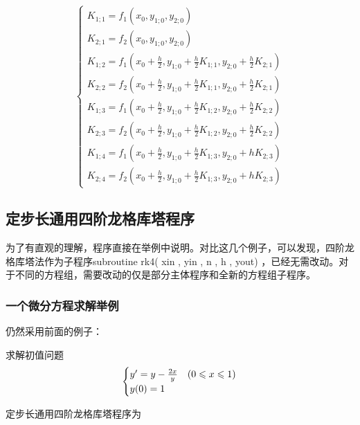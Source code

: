 $$\begin{cases}
K_{1;1}=f_1(x_0,y_{1;0},y_{2;0})\\
K_{2;1}=f_2(x_0,y_{1;0},y_{2;0})\\
K_{1;2}=f_1(x_0+\frac{h}{2},y_{1;0}+\frac{h}{2}K_{1;1},y_{2;0}+\frac{h}{2}K_{2;1})\\
K_{2;2}=f_2(x_0+\frac{h}{2},y_{1;0}+\frac{h}{2}K_{1;1},y_{2;0}+\frac{h}{2}K_{2;1})\\
K_{1;3}=f_1(x_0+\frac{h}{2},y_{1;0}+\frac{h}{2}K_{1;2},y_{2;0}+\frac{h}{2}K_{2;2})\\
K_{2;3}=f_2(x_0+\frac{h}{2},y_{1;0}+\frac{h}{2}K_{1;2},y_{2;0}+\frac{h}{2}K_{2;2})\\
K_{1;4}=f_1(x_0+\frac{h}{2},y_{1;0}+\frac{h}{2}K_{1;3},y_{2;0}+hK_{2;3})\\
K_{2;4}=f_2(x_0+\frac{h}{2},y_{1;0}+\frac{h}{2}K_{1;3},y_{2;0}+hK_{2;3})
\end{cases}$$



\subsection{定步长通用四阶龙格库塔程序}
为了有直观的理解，程序直接在举例中说明。对比这几个例子，可以发现，四阶龙格库塔法作为子程序subroutine rk4( xin , yin , n , h , yout) ，已经无需改动。对于不同的方程组，需要改动的仅是部分主体程序和全新的方程组子程序。
\subsubsection{一个微分方程求解举例}
仍然采用前面的例子：

求解初值问题
$$\begin{cases}y\rq{}=y-\frac{2x}{y} &(0 \le x \le 1)\\ y(0)=1\end{cases}$$

定步长通用四阶龙格库塔程序为

